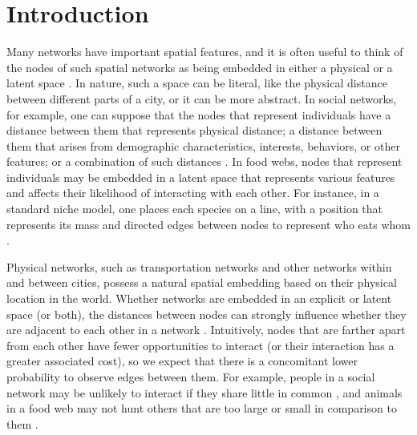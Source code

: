 \documentclass[%
 reprint,
 amsmath,amssymb,
 aps,
]{revtex4-1}
\begin{document}



\section{Introduction} \label{sec:introduction}

Many networks have important spatial features, and it is often useful to think of the nodes of such spatial networks as being embedded in either a physical or a latent space \cite{barthelemy,newman2018,geometry-review}. In nature, such a space can be literal, like the physical distance between different parts of a city, or it can be more abstract. In social networks, for example, one can suppose that the nodes that represent individuals have a distance between them that represents physical distance; a distance between them that arises from demographic characteristics, interests, behaviors, or other features; or a combination of such distances \cite{social}. In food webs, nodes that represent individuals may be embedded in a latent space that represents various features and affects their likelihood of interacting with each other. For instance, in a standard niche model, one places each species on a line, with a position that represents its mass and directed edges between nodes to represent who eats whom \cite{foodwebs}.
 
Physical networks, such as transportation networks and other networks within and between cities, possess a natural spatial embedding based on their physical location in the world. Whether networks are embedded in an explicit or latent space (or both), the distances between nodes can strongly influence whether they are adjacent to each other in a network \cite{geometry-review,spatial1,air-traffic,routelengthstatistic,papa2018}. Intuitively, nodes that are farther apart from each other have fewer opportunities to interact (or their interaction has a greater associated cost), so we expect that there is a concomitant lower probability to observe edges between them. For example, people in a social network may be unlikely to interact if they share little in common \cite{socialdistance}, and animals in a food web may not hunt others that are too large or small in comparison to them \cite{foodwebs}. 
\end{document}
